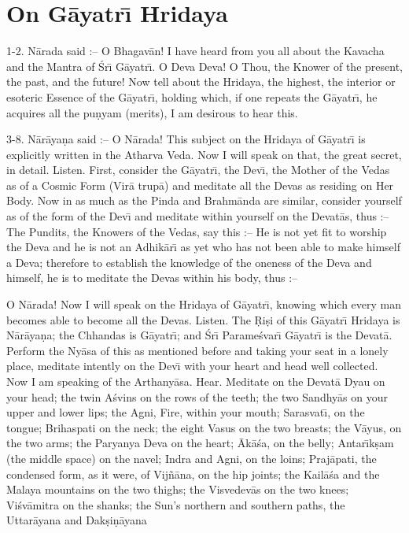 \chapter{On G\=ayatr\={\i} Hridaya}

1-2. N\=arada said :-- O Bhagav\=an! I have heard from you all about the Kavacha and the Mantra of \'Sr\={\i} G\=ayatr\={\i}. O Deva Deva! O Thou, the Knower of the present, the past, and the future! Now tell about the Hridaya, the highest, the interior or esoteric Essence of the G\=ayatr\={\i}, holding which, if one repeats the G\=ayatr\={\i}, he acquires all the pu\d{n}yam (merits), I am desirous to hear this.

3-8. N\=ar\=aya\d{n}a said :-- O N\=arada! This subject on the Hridaya of G\=ayatr\={\i} is explicitly written in the Atharva Veda. Now I will speak on that, the great secret, in detail. Listen. First, consider the G\=ayatr\={\i}, the Dev\={\i}, the Mother of the Vedas as of a Cosmic Form (Vir\=a trup\=a) and meditate all the Devas as residing on Her Body. Now in as much as the Pinda and Brahm\=anda are similar, consider yourself as of the form of the Dev\={\i} and meditate within yourself on the Devat\=as, thus :-- The Pundits, the Knowers of the Vedas, say this :-- He is not yet fit to worship the Deva and he is not an Adhik\=ar\={\i} as yet who has not been able to make himself a Deva; therefore to establish the knowledge of the oneness of the Deva and himself, he is to meditate the Devas within his body, thus :--

O N\=arada! Now I will speak on the Hridaya of G\=ayatr\={\i}, knowing which every man becomes able to become all the Devas. Listen. The \d{R}i\d{s}i of this G\=ayatr\={\i} Hridaya is N\=ar\=aya\d{n}a; the Chhandas is G\=ayatr\={\i}; and \'Sr\={\i} Parame\'svar\={\i} G\=ayatr\={\i} is the Devat\=a. Perform the Ny\=asa of this as mentioned before and taking your seat in a lonely place, meditate intently on the Dev\={\i} with your heart and head well collected. Now I am speaking of the Arthany\=asa. Hear. Meditate on the Devat\=a Dyau on your head; the twin A\'svins on the rows of the teeth; the two Sandhy\=as on your upper and lower lips; the Agni, Fire, within your mouth; Sarasvat\={\i}, on the tongue; Brihaspati on the neck; the eight Vasus on the two breasts; the V\=ayus, on the two arms; the Paryanya Deva on the heart; \=Ak\=a\'sa, on the belly; Antar\={\i}k\d{s}am (the middle space) on the navel; Indra and Agni, on the loins; Praj\=apati, the condensed form, as it were, of Vij\~n\=ana, on the hip joints; the Kail\=a\'sa and the Malaya mountains on the two thighs; the Visvedev\=as on the two knees; Vi\'sv\=amitra on the shanks; the Sun's northern and southern paths, the Uttar\=ayana and Dak\d{s}i\d{n}\=ayana

